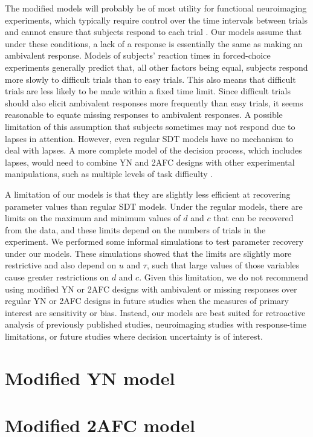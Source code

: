 \documentclass[man]{apa6}
\begin{document}
The modified models will probably be of most utility for functional neuroimaging experiments, which typically require control over the time intervals between trials and cannot ensure that subjects respond to each trial \parencite[e.g.][]{kreitewolfhemispheric2014}. Our models assume that under these conditions, a lack of a response is essentially the same as making an ambivalent response. Models of subjects' reaction times in forced-choice experiments\parencite[e.g.,][]{ratcliffthe2008} generally predict that, all other factors being equal, subjects respond more slowly to difficult trials than to easy trials. This also means that difficult trials are less likely to be made within a fixed time limit. Since difficult trials should also elicit ambivalent responses more frequently than easy trials, it seems reasonable to equate missing responses to ambivalent responses. A possible limitation of this assumption that subjects sometimes may not respond due to lapses in attention. However, even regular SDT models have no mechanism to deal with lapses. A more complete model of the decision process, which includes lapses, would need to combine YN and 2AFC designs with other experimental manipulations, such as multiple levels of task difficulty \parencite[see][]{goldhow2013}.

A limitation of our models is that they are slightly less efficient at recovering parameter values than regular SDT models. Under the regular models, there are limits on the maximum and minimum values of $d$ and $c$ that can be recovered from the data, and these limits depend on the numbers of trials in the experiment. We performed some informal simulations to test parameter recovery under our models. These simulations showed that the limits are slightly more restrictive and also depend on $u$ and $\tau$, such that large values of those variables cause greater restrictions on $d$ and $c$. Given this limitation, we do not recommend using modified YN or 2AFC designs with ambivalent or missing responses over regular YN or 2AFC designs in future studies when the measures of primary interest are sensitivity or bias. Instead, our models are best suited for retroactive analysis of previously published studies, neuroimaging studies with response-time limitations, or future studies where decision uncertainty is of interest.



\printbibliography

\appendix
\label{app:b}
\section{Modified YN model}

\appendix
\appendix
\label{app:c}
\section{Modified 2AFC model}

\end{document}
